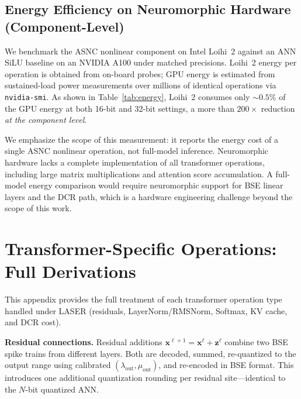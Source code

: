\documentclass{article}
\theoremstyle{plain}
\theoremstyle{definition}
\theoremstyle{remark}
\begin{document}
\subsection{Energy Efficiency on Neuromorphic Hardware (Component-Level)}
\label{subsec:exp_energy}

We benchmark the ASNC nonlinear component on Intel Loihi~2 against an ANN
SiLU baseline on an NVIDIA A100 under matched precisions. Loihi~2 energy per
operation is obtained from on-board probes; GPU energy is estimated from
sustained-load power measurements over millions of identical operations via
\texttt{nvidia-smi}. As shown in Table~\ref{tab:energy}, Loihi~2 consumes
only ${\sim}0.5\%$ of the GPU energy at both 16-bit and 32-bit settings, a
more than $200\times$ reduction \emph{at the component level}.

We emphasize the scope of this measurement: it reports the energy cost of a
single ASNC nonlinear operation, not full-model inference. Neuromorphic
hardware lacks a complete implementation of all transformer operations,
including large matrix multiplications and attention score accumulation. A
full-model energy comparison would require neuromorphic support for BSE
linear layers and the DCR path, which is a hardware engineering challenge
beyond the scope of this work.







\appendix

\section{Transformer-Specific Operations: Full Derivations}
\label{app:transformer_ops}

This appendix provides the full treatment of each transformer operation type
handled under LASER (residuals, LayerNorm/RMSNorm, Softmax, KV cache, and DCR
cost).

\noindent\textbf{Residual connections.}
Residual additions $\mathbf{x}^{\ell+1} = \mathbf{x}^\ell + \mathbf{z}^\ell$
combine two BSE spike trains from different layers. Both are decoded, summed,
re-quantized to the output range using calibrated
$(\lambda_\mathrm{out}, \mu_\mathrm{out})$, and re-encoded in BSE format. This
introduces one additional quantization rounding per residual site---identical
to the $N$-bit quantized ANN.
\end{document}
